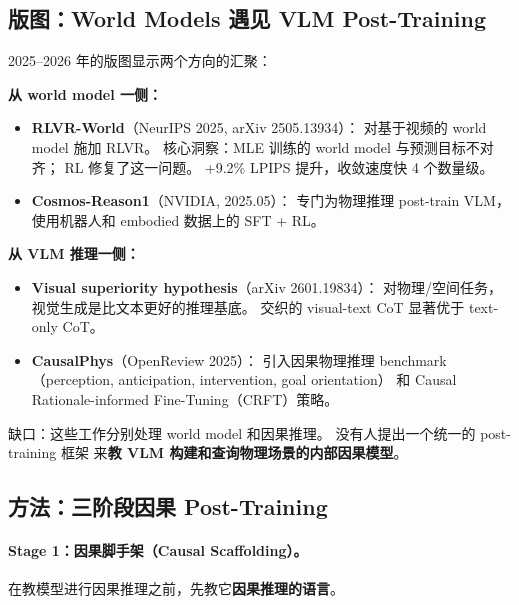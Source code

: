 \documentclass[12pt,a4paper]{article}
\begin{document}
\subsection{版图：World Models 遇见 VLM Post-Training}

2025--2026 年的版图显示两个方向的汇聚：

\textbf{从 world model 一侧：}
\begin{itemize}[leftmargin=2em]
  \item \textbf{RLVR-World}（NeurIPS 2025, arXiv 2505.13934）：
    对基于视频的 world model 施加 RLVR。
    核心洞察：MLE 训练的 world model 与预测目标不对齐；
    RL 修复了这一问题。
    +9.2\% LPIPS 提升，收敛速度快 4 个数量级。
  \item \textbf{Cosmos-Reason1}（NVIDIA, 2025.05）：
    专门为物理推理 post-train VLM，
    使用机器人和 embodied 数据上的 SFT + RL。
\end{itemize}

\textbf{从 VLM 推理一侧：}
\begin{itemize}[leftmargin=2em]
  \item \textbf{Visual superiority hypothesis}（arXiv 2601.19834）：
    对物理/空间任务，视觉生成是比文本更好的推理基底。
    交织的 visual-text CoT 显著优于 text-only CoT。
  \item \textbf{CausalPhys}（OpenReview 2025）：
    引入因果物理推理 benchmark
    （perception, anticipation, intervention, goal orientation）
    和 Causal Rationale-informed Fine-Tuning（CRFT）策略。
\end{itemize}

\noindent
缺口：这些工作分别处理 world model 和因果推理。
没有人提出一个统一的 post-training 框架
来\textbf{教 VLM 构建和查询物理场景的内部因果模型}。

\subsection{方法：三阶段因果 Post-Training}

\paragraph{Stage 1：因果脚手架（Causal Scaffolding）。}

在教模型进行因果推理之前，先教它\textbf{因果推理的语言}。
\end{document}

